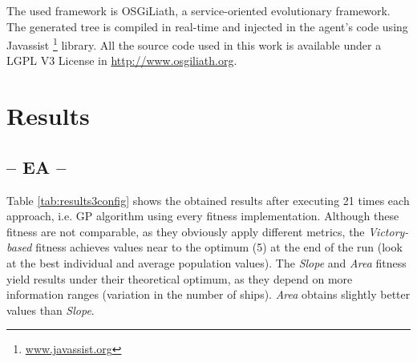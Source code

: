 \documentclass[preprint]{elsarticle}
\begin{document}


The used framework is OSGiLiath, a service-oriented evolutionary framework. %
The generated tree is compiled in real-time and injected in the agent's code using Javassist \footnote{\url{www.javassist.org}} library. All the source code used in this work is available under a LGPL V3 License in \url{http://www.osgiliath.org}.


\section{Results}
\label{sec:results}
\subsection{-- EA --}

Table \ref{tab:results3config} shows the obtained results after executing 21 times each approach, i.e. GP algorithm using every fitness implementation. 
Although these fitness are not comparable, as they obviously apply different metrics, the \textit{Victory-based} fitness achieves values near to the optimum (5) at the end of the run (look at the best individual and average population values). The \textit{Slope} and \textit{Area} fitness yield results under their theoretical optimum, 
as they depend on more information ranges (variation in the number of ships).
\textit{Area} obtains slightly better values than \textit{Slope}. 

\end{document}
